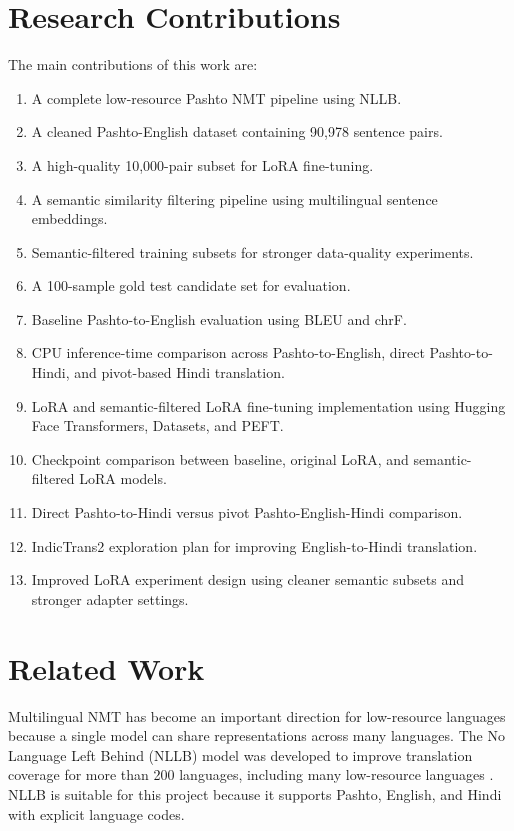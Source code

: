 \documentclass[conference]{IEEEtran}
\begin{document}
\section{Research Contributions}

The main contributions of this work are:

\begin{enumerate}
    \item A complete low-resource Pashto NMT pipeline using NLLB.
    \item A cleaned Pashto-English dataset containing 90,978 sentence pairs.
    \item A high-quality 10,000-pair subset for LoRA fine-tuning.
    \item A semantic similarity filtering pipeline using multilingual sentence embeddings.
    \item Semantic-filtered training subsets for stronger data-quality experiments.
    \item A 100-sample gold test candidate set for evaluation.
    \item Baseline Pashto-to-English evaluation using BLEU and chrF.
    \item CPU inference-time comparison across Pashto-to-English, direct Pashto-to-Hindi, and pivot-based Hindi translation.
    \item LoRA and semantic-filtered LoRA fine-tuning implementation using Hugging Face Transformers, Datasets, and PEFT.
    \item Checkpoint comparison between baseline, original LoRA, and semantic-filtered LoRA models.
    \item Direct Pashto-to-Hindi versus pivot Pashto-English-Hindi comparison.
    \item IndicTrans2 exploration plan for improving English-to-Hindi translation.
    \item Improved LoRA experiment design using cleaner semantic subsets and stronger adapter settings.
\end{enumerate}

\section{Related Work}

Multilingual NMT has become an important direction for low-resource languages because a single model can share representations across many languages. The No Language Left Behind (NLLB) model was developed to improve translation coverage for more than 200 languages, including many low-resource languages \cite{nllb}. NLLB is suitable for this project because it supports Pashto, English, and Hindi with explicit language codes.
\end{document}

